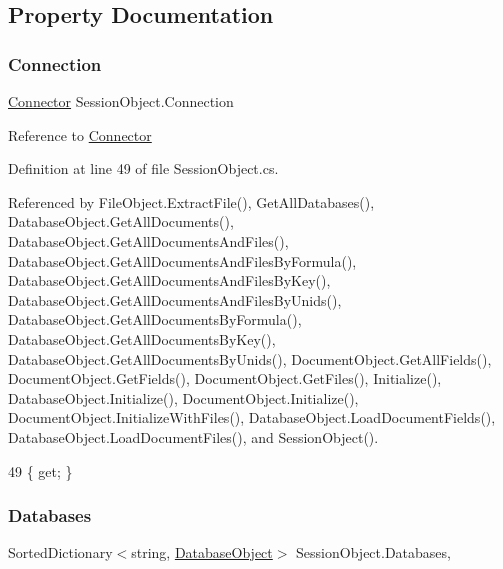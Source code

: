 \subsection{Property Documentation}
\mbox{\label{class_session_object_a014bdbf705a753540e19bfb53030c55c}} 
\subsubsection{\texorpdfstring{Connection}{Connection}}
{\footnotesize\ttfamily \mbox{\hyperlink{class_connector}{Connector}} Session\+Object.\+Connection\hspace{0.3cm}{\ttfamily [get]}}



Reference to \mbox{\hyperlink{class_connector}{Connector}} 



Definition at line 49 of file Session\+Object.\+cs.



Referenced by File\+Object.\+Extract\+File(), Get\+All\+Databases(), Database\+Object.\+Get\+All\+Documents(), Database\+Object.\+Get\+All\+Documents\+And\+Files(), Database\+Object.\+Get\+All\+Documents\+And\+Files\+By\+Formula(), Database\+Object.\+Get\+All\+Documents\+And\+Files\+By\+Key(), Database\+Object.\+Get\+All\+Documents\+And\+Files\+By\+Unids(), Database\+Object.\+Get\+All\+Documents\+By\+Formula(), Database\+Object.\+Get\+All\+Documents\+By\+Key(), Database\+Object.\+Get\+All\+Documents\+By\+Unids(), Document\+Object.\+Get\+All\+Fields(), Document\+Object.\+Get\+Fields(), Document\+Object.\+Get\+Files(), Initialize(), Database\+Object.\+Initialize(), Document\+Object.\+Initialize(), Document\+Object.\+Initialize\+With\+Files(), Database\+Object.\+Load\+Document\+Fields(), Database\+Object.\+Load\+Document\+Files(), and Session\+Object().


\begin{DoxyCode}
49 \{ \textcolor{keyword}{get}; \}
\end{DoxyCode}
\mbox{\label{class_session_object_aa0b75f5b9d0a6325f436e08db27204a2}} 
\subsubsection{\texorpdfstring{Databases}{Databases}}
{\footnotesize\ttfamily Sorted\+Dictionary$<$string, \mbox{\hyperlink{class_database_object}{Database\+Object}}$>$ Session\+Object.\+Databases\hspace{0.3cm}{\ttfamily [get]}, {\ttfamily [set]}}



